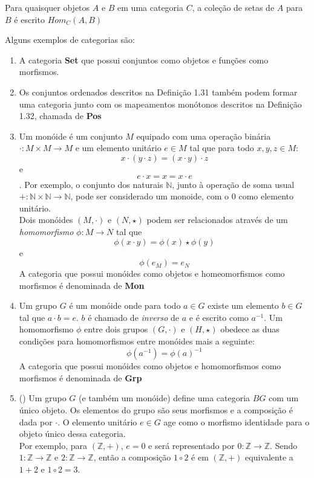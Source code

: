 \documentclass[../main.tex]{subfiles}
\begin{document}
Para quaisquer objetos $A$ e $B$ em uma categoria $C$, a coleção de setas de $A$ para $B$ é escrito $Hom_C(A, B)$

Alguns exemplos de categorias são:

\begin{enumerate}
    \item A categoria \textbf{Set} que possui conjuntos como objetos e funções como morfismos. 
    \item Os conjuntos ordenados descritos na Definição 1.31 também podem formar uma categoria junto com os mapeamentos monótonos descritos na Definição 1.32, chamada de \textbf{Pos}
    \item Um monóide é um conjunto $M$ equipado com uma operação binária $\cdot : M \times M \to M$ e um elemento unitário $e \in M$ tal que para todo $x, y, z \in M$: $$x \cdot (y \cdot z) = (x \cdot y) \cdot z$$ e $$e \cdot x = x = x \cdot e$$. Por exemplo, o conjunto dos naturais $\mathbb{N}$, junto à operação de soma usual $+ : \mathbb{N} \times \mathbb{N} \to \mathbb{N}$, pode ser considerado um monoide, com o $0$ como elemento unitário. \\
    Dois monóides $(M, \cdot)$ e $(N, \star)$ podem ser relacionados através de um \emph{homomorfismo} $\phi : M \to N$ tal que $$\phi (x \cdot y) = \phi(x) \star \phi(y)$$ e $$\phi(e_M) = e_N$$
    A categoria que possui monóides como objetos e homeomorfismos como morfismos é denominada de \textbf{Mon}
    \item Um grupo $G$ é um monóide onde para todo $a \in G$ existe um elemento $b \in G$ tal que $a \cdot b = e$. $b$ é chamado de \emph{inverso} de $a$ e é escrito como $a^{-1}$. Um homomorfismo $\phi$ entre dois grupos $(G, \cdot)$ e $(H, \star)$ obedece as duas condições para homomorfismos entre monóides mais a seguinte: $$\phi(a^{-1}) = \phi(a)^{-1}$$ A categoria que possui monóides como objetos e homomorfismos como morfismos é denominada de \textbf{Grp}
    \item (\cite{riehl2017}) Um grupo $G$ (e também um monóide) define uma categoria $BG$ com um único objeto. Os elementos do grupo são seus morfismos e a composição é dada por $\cdot$. O elemento unitário $e \in G$ age como o morfismo identidade para o objeto único dessa categoria. \\ Por exemplo, para $(\mathbb{Z}, +)$, $e = 0$ e será representado por $0 : \mathbb{Z} \to \mathbb{Z}$. Sendo $ 1 : \mathbb{Z} \to \mathbb{Z}$ e $2 : \mathbb{Z} \to \mathbb{Z}$, então a composição $1 \circ 2$ é em $(\mathbb{Z}, +)$ equivalente a $1 + 2$ e $1 \circ 2 = 3$.
\end{enumerate}
\end{document}
